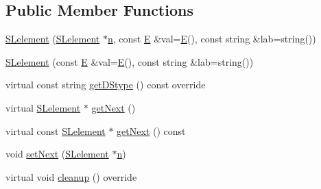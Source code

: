 \subsection*{Public Member Functions}
\begin{DoxyCompactItemize}
\item 
\mbox{\hyperlink{classbridges_1_1_s_lelement_a9ddac46a935b85cde76305135d16de0a}{S\+Lelement}} (\mbox{\hyperlink{classbridges_1_1_s_lelement}{S\+Lelement}} $\ast$\mbox{\hyperlink{namespacebridges_acfb0a4f7877d8f63de3e6862004c50eda7b8b965ad4bca0e41ab51de7b31363a1}{n}}, const \mbox{\hyperlink{namespacebridges_acfb0a4f7877d8f63de3e6862004c50eda3a3ea00cfc35332cedf6e5e9a32e94da}{E}} \&val=\mbox{\hyperlink{namespacebridges_acfb0a4f7877d8f63de3e6862004c50eda3a3ea00cfc35332cedf6e5e9a32e94da}{E}}(), const string \&lab=string())
\item 
\mbox{\hyperlink{classbridges_1_1_s_lelement_a76423021747b1f2090847c418c13352b}{S\+Lelement}} (const \mbox{\hyperlink{namespacebridges_acfb0a4f7877d8f63de3e6862004c50eda3a3ea00cfc35332cedf6e5e9a32e94da}{E}} \&val=\mbox{\hyperlink{namespacebridges_acfb0a4f7877d8f63de3e6862004c50eda3a3ea00cfc35332cedf6e5e9a32e94da}{E}}(), const string \&lab=string())
\item 
virtual const string \mbox{\hyperlink{classbridges_1_1_s_lelement_a136330b3481a47b3edb429f323274655}{get\+D\+Stype}} () const override
\item 
virtual \mbox{\hyperlink{classbridges_1_1_s_lelement}{S\+Lelement}} $\ast$ \mbox{\hyperlink{classbridges_1_1_s_lelement_a5bd74108a9aa49339378bf62cdbb19ca}{get\+Next}} ()
\item 
virtual const \mbox{\hyperlink{classbridges_1_1_s_lelement}{S\+Lelement}} $\ast$ \mbox{\hyperlink{classbridges_1_1_s_lelement_a4422b7731a84734d312b8cd8e241b1e8}{get\+Next}} () const
\item 
void \mbox{\hyperlink{classbridges_1_1_s_lelement_a347f8809406f930ce83bf44764a4f1b5}{set\+Next}} (\mbox{\hyperlink{classbridges_1_1_s_lelement}{S\+Lelement}} $\ast$\mbox{\hyperlink{namespacebridges_acfb0a4f7877d8f63de3e6862004c50eda7b8b965ad4bca0e41ab51de7b31363a1}{n}})
\item 
virtual void \mbox{\hyperlink{classbridges_1_1_s_lelement_ac747648849874407e9d907bb4557dd52}{cleanup}} () override
\end{DoxyCompactItemize}
